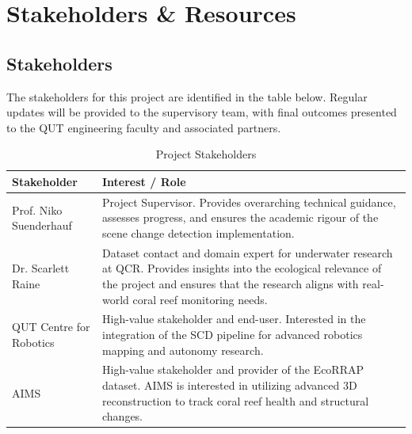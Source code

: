 \chapter{Stakeholders \& Resources}

\section{Stakeholders}
The stakeholders for this project are identified in the table below. Regular updates will be provided to the supervisory team, with final outcomes presented to the QUT engineering faculty and associated partners.

\begin{table}[H]
\centering
\caption{Project Stakeholders}
\begin{tabularx}{\textwidth}{l X}
\toprule
\textbf{Stakeholder} & \textbf{Interest / Role} \\
\midrule
Prof. Niko Suenderhauf & Project Supervisor. Provides overarching technical guidance, assesses progress, and ensures the academic rigour of the scene change detection implementation. \\
\addlinespace
Dr. Scarlett Raine & Dataset contact and domain expert for underwater research at QCR. Provides insights into the ecological relevance of the project and ensures that the research aligns with real-world coral reef monitoring needs. \\
\addlinespace
QUT Centre for Robotics & High-value stakeholder and end-user. Interested in the integration of the SCD pipeline for advanced robotics mapping and autonomy research. \\
\addlinespace
AIMS & High-value stakeholder and provider of the EcoRRAP dataset. AIMS is interested in utilizing advanced 3D reconstruction to track coral reef health and structural changes. \\
\bottomrule
\end{tabularx}
\end{table}

